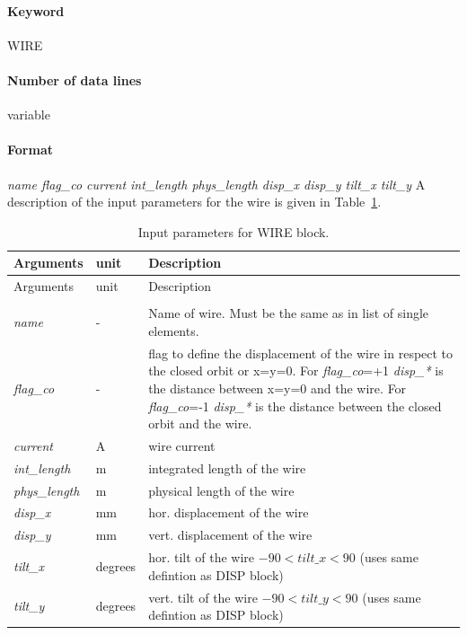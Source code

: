 \documentclass[a4paper,11pt]{report}
\begin{document}
\paragraph{Keyword} WIRE

\paragraph{Number of data lines} variable

\paragraph{Format} \emph{name flag\_co current int\_length phys\_length disp\_x disp\_y tilt\_x tilt\_y}
A description of the input parameters for the wire is given in Table~\ref{tab:wire}.
\begin{center}
	\begin{longtable}{|p{2.0cm} p{1.0cm} p{9.2cm}|}
		\caption{Input parameters for WIRE block.}
		\label{tab:wire} \\*
		\hline
		\rowcolor{blue!30}
		Arguments & unit & Description \\*
		\hline
		\endfirsthead
		
		\hline
		\rowcolor{blue!30}
		Arguments & unit & Description \\*
		\endhead
		
		\rowcolor{gray!15}
		\multicolumn{3}{|c|}{(The table continues on the next page)}\\*
		\hline
		\endfoot
		
		\hline
		\endlastfoot
		
		\hline
		
		\emph{name} & - &
		Name of wire. Must be the same as in list of single elements.\\*
		
		\emph{flag\_co} & - &
		flag to define the displacement of the wire in respect to the closed orbit or x=y=0. For \emph{flag\_co}=+1 \emph{disp\_*} is the distance between x=y=0 and the wire. For \emph{flag\_co}=-1 \emph{disp\_*} is the distance between the closed orbit and the wire.\\*
		\emph{current} & A &
		wire current \\*
		\emph{int\_length} & m &
		integrated length of the wire\\*
		\emph{phys\_length} & m &
		physical length of the wire\\*
		\emph{disp\_x} & mm &
		hor. displacement of the wire\\*
		\emph{disp\_y} & mm &
		vert. displacement of the wire\\*
		\emph{tilt\_x} & degrees &
		hor. tilt of the wire $-90 < tilt\_x < 90$ (uses same defintion as DISP block) \\*
		\emph{tilt\_y} & degrees &
		vert. tilt of the wire $-90 < tilt\_y < 90$ (uses same defintion as DISP block) \\*
		\hline		
	\end{longtable}
\end{center}
\end{document}
